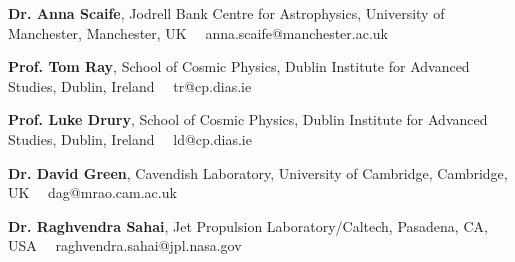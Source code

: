 \begin{cvpubs}
  \cvpub
    {
      \begin{cvlist}
        \item {\textbf{Dr. Anna Scaife}, Jodrell Bank Centre for Astrophysics, University of Manchester, Manchester, UK \hspace{1ex} \faEnvelope\ \ anna.scaife@manchester.ac.uk}
        \item {\textbf{Prof. Tom Ray}, School of Cosmic Physics, Dublin Institute for Advanced Studies, Dublin, Ireland \hspace{1ex} \faEnvelope\ \ tr@cp.dias.ie}
        \item {\textbf{Prof. Luke Drury}, School of Cosmic Physics, Dublin Institute for Advanced Studies, Dublin, Ireland \hspace{1ex} \faEnvelope\ \ ld@cp.dias.ie}
        \item {\textbf{Dr. David Green}, Cavendish Laboratory, University of Cambridge, Cambridge, UK \hspace{1ex} \faEnvelope\ \ dag@mrao.cam.ac.uk}
        \item {\textbf{Dr. Raghvendra Sahai}, Jet Propulsion Laboratory/Caltech, Pasadena, CA, USA \hspace{1ex} \faEnvelope\ \ raghvendra.sahai@jpl.nasa.gov}
      \end{cvlist}
    }
\end{cvpubs}